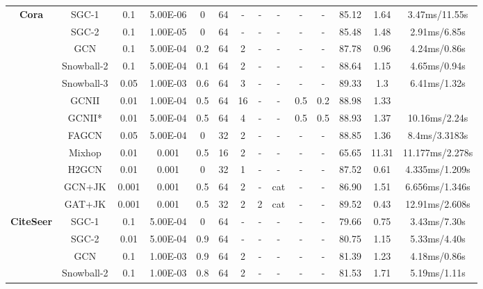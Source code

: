 \documentclass{article}
\newcommand{\0}{{\boldsymbol{0}}}
\newcommand{\6}{{\partial}}
\newcommand{\8}{{\infty}}
\newcommand{\4}{{\nabla}}
\begin{document}
\begin{table}[htbp]
{\begin{tabular}{c|c|cccccccccccc}
          \midrule
    \multirow{12}[1]{*}{\textbf{Cora}} & SGC-1 & 0.1   & 5.00E-06 & 0     & 64    & -     & -     & -     & -     & -     & 85.12 & 1.64  & 3.47ms/11.55s \\
          & SGC-2 & 0.1   & 1.00E-05 & 0     & 64    & -     & -     & -     & -     & -     & 85.48 & 1.48  & 2.91ms/6.85s \\
          & GCN   & 0.1   & 5.00E-04 & 0.2   & 64    & 2     & -     & -     & -     & -     & 87.78 & 0.96  & 4.24ms/0.86s \\
          & Snowball-2 & 0.1   & 5.00E-04 & 0.1   & 64    & 2     & -     & -     & -     & -     & 88.64 & 1.15  & 4.65ms/0.94s \\
          & Snowball-3 & 0.05  & 1.00E-03 & 0.6   & 64    & 3     & -     & -     & -     & -     & 89.33 & 1.3   & 6.41ms/1.32s \\
          & GCNII & 0.01  & 1.00E-04 & 0.5   & 64    & 16    & -     & -     & 0.5   & 0.2   & 88.98 & 1.33  &  \\
          & GCNII* & 0.01  & 5.00E-04 & 0.5   & 64    & 4     & -     & -     & 0.5   & 0.5   & 88.93 & 1.37  & 10.16ms/2.24s \\
          & FAGCN & 0.05  & 5.00E-04 & 0     & 32    & 2     & -     & -     & -     & -     & 88.85 & 1.36  & 8.4ms/3.3183s \\
          &  Mixhop & 0.01  & 0.001 & 0.5   & 16    & 2     & - & - & - & - & 65.65 & 11.31 & {11.177ms/2.278s} \\
          & H2GCN & 0.01  & 0.001 & 0     & 32    & 1     & - & - & - & - & 87.52 & 0.61  & {4.335ms/1.209s} \\
          & GCN+JK & 0.001 & 0.001 & 0.5   & 64    & 2     & - & {cat} & - & - & 86.90 & 1.51  & {6.656ms/1.346s} \\
          &  GAT+JK & 0.001 & 0.001 & 0.5   & 32    & 2     & 2     & {cat} & - & - & 89.52 & 0.43  & {12.91ms/2.608s} \\
    \midrule
    \multirow{12}[1]{*}{\textbf{CiteSeer}} & SGC-1 & 0.1   & 5.00E-04 & 0     & 64    & -     & -     & -     & -     & -     & 79.66 & 0.75  & 3.43ms/7.30s \\
          & SGC-2 & 0.01  & 5.00E-04 & 0.9   & 64    & -     & -     & -     & -     & -     & 80.75 & 1.15  & 5.33ms/4.40s \\
          & GCN   & 0.1   & 1.00E-03 & 0.9   & 64    & 2     & -     & -     & -     & -     & 81.39 & 1.23  & 4.18ms/0.86s \\
          & Snowball-2 & 0.1   & 1.00E-03 & 0.8   & 64    & 2     & -     & -     & -     & -     & 81.53 & 1.71  & 5.19ms/1.11s \\

\end{tabular}}
\end{table}
\end{document}
